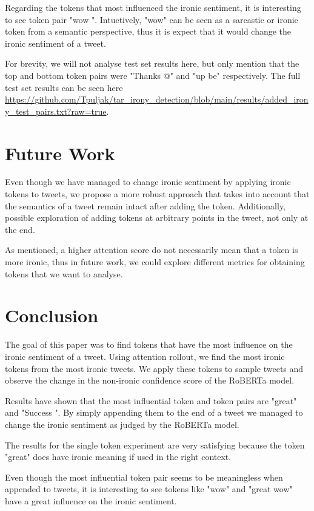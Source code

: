 \documentclass[10pt, a4paper]{article}
\begin{document}
Regarding the tokens that most influenced the ironic sentiment, it is interesting to see token pair "wow \textvisiblespace ".
Intuetively, "wow" can be seen as a sarcastic or ironic token from a semantic perspective, thus it is expect that it would change the ironic sentiment of a tweet.

For brevity, we will not analyse test set results here, but only mention that the top and bottom token pairs were "Thanks @" and "up be" respectively.
The full test set results can be seen here \url{https://github.com/Tpuljak/tar_irony_detection/blob/main/results/added_irony_test_pairs.txt?raw=true}.

\section{Future Work}

Even though we have managed to change ironic sentiment by applying ironic tokens to tweets, we propose a more robust approach that takes into account that the semantics of a tweet remain intact after adding the token.
Additionally, possible exploration of adding tokens at arbitrary points in the tweet, not only at the end.

As mentioned, a higher attention score do not necessarily mean that a token is more ironic, thus in future work, we could explore different metrics for obtaining tokens that we want to analyse.

\section{Conclusion}

The goal of this paper was to find tokens that have the most influence on the ironic sentiment of a tweet.
Using attention rollout, we find the most ironic tokens from the most ironic tweets.
We apply these tokens to sample tweets and observe the change in the non-ironic confidence score of the RoBERTa model.

Results have shown that the most influential token and token pairs are "great" and "Success \textvisiblespace ".
By simply appending them to the end of a tweet we managed to change the ironic sentiment as judged by the RoBERTa model.

The results for the single token experiment are very satisfying because the token "great" does have ironic meaning if used in the right context.

Even though the most influential token pair seems to be meaningless when appended to tweets, it is interesting to see tokens like "wow" and "great wow" have a great influence on the ironic sentiment.


 
\end{document}
